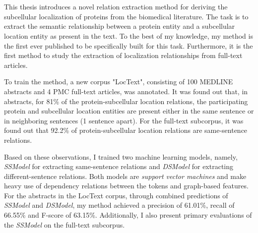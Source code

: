 \chapter{\abstractname}


This thesis introduces a novel relation extraction method for deriving the subcellular localization of proteins from the biomedical literature. The task is to extract the semantic relationship between a protein entity and a subcellular location entity as present in the text. To the best of my knowledge, my method is the first ever published to be specifically built for this task. Furthermore, it is the first method to study the extraction of localization relationships from full-text articles.

To train the method, a new corpus "LocText", consisting of 100 MEDLINE abstracts and 4 PMC full-text articles, was annotated. It was found out that, in abstracts, for 81\% of the protein-subcellular location relations, the participating protein and  subcellular location entities are present either in the same sentence or in neighboring sentences (1 sentence apart). For the full-text subcorpus, it was found out that 92.2\% of protein-subcellular location relations are same-sentence relations.

Based on these observations, I trained two machine learning models, namely, \textit{SSModel} for extracting same-sentence relations and \textit{DSModel} for extracting different-sentence relations. Both models are \textit{support vector machines} and make heavy use of dependency relations between the tokens and graph-based features. For the abstracts in the LocText corpus, through combined predictions of \textit{SSModel} and \textit{DSModel}, my method achieved a precision of 61.01\%, recall of 66.55\% and F-score of 63.15\%. Additionally, I also present primary evaluations of the \textit{SSModel} on the full-text subcorpus.